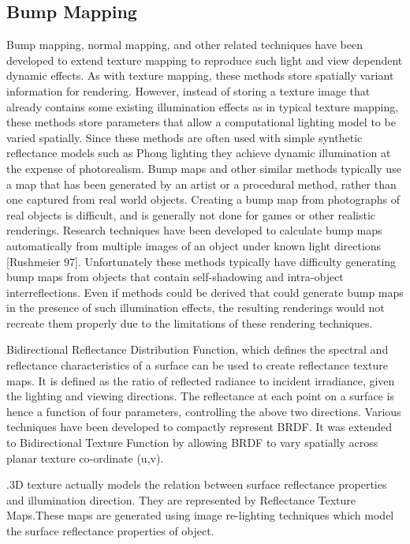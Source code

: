 \subsection{Bump Mapping}

Bump mapping, normal mapping, and other related techniques have been developed to extend texture mapping to
reproduce such light and view dependent dynamic effects. As with texture mapping, these methods store spatially
variant information for rendering. However, instead of storing a texture image that already contains some existing
illumination effects as in typical texture mapping, these methods store parameters that allow a computational 
lighting model to be varied spatially. Since these methods are often used with simple synthetic reflectance models
such as Phong lighting they achieve dynamic illumination at the expense of photorealism.
Bump maps and other similar methods typically use a map that has been generated by an artist or a procedural
method, rather than one captured from real world objects. Creating a bump map from photographs of real objects
is difficult, and is generally not done for games or other realistic renderings. Research techniques have been
developed to calculate bump maps automatically from multiple images of an object under known light directions 
[Rushmeier 97]. Unfortunately these methods typically have difficulty generating bump maps from objects that 
contain self-shadowing and intra-object interreflections. Even if methods could be derived that could generate
bump maps in the presence of such illumination effects, the resulting renderings would not recreate them properly
due to the limitations of these rendering techniques.

Bidirectional Reflectance Distribution Function, which defines the
spectral and reflectance characteristics of a surface can be used to create
reflectance texture maps. It is defined as the ratio of reflected radiance to
incident irradiance, given the lighting and viewing directions. The reflectance
at each point on a surface is hence a function of four parameters, controlling
the above two directions. Various techniques have been developed to compactly
represent BRDF. It was extended to Bidirectional
Texture Function by allowing BRDF to vary spatially across planar
texture co-ordinate (u,v).

.3D texture actually models the relation
between surface reflectance properties and illumination direction. They are represented
by Reflectance Texture Maps.These maps are generated using image re-lighting techniques
which model the surface reflectance properties of object.

